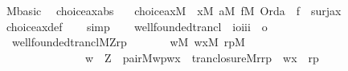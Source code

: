 \begin{isabellebody}
\isanewline
{}\isamarkupfalse%
\ M{\isacharunderscore}{\kern0pt}basic\ \isanewline
\isanewline
{}\isamarkupfalse%
\ choice{\isacharunderscore}{\kern0pt}ax{\isacharunderscore}{\kern0pt}abs\ {\isacharcolon}{\kern0pt}\isanewline
\ \ {\isachardoublequoteopen}choice{\isacharunderscore}{\kern0pt}ax{\isacharparenleft}{\kern0pt}M{\isacharparenright}{\kern0pt}\ {\isasymlongleftrightarrow}\ {\isacharparenleft}{\kern0pt}{\isasymforall}x{\isacharbrackleft}{\kern0pt}M{\isacharbrackright}{\kern0pt}{\isachardot}{\kern0pt}\ {\isasymexists}a{\isacharbrackleft}{\kern0pt}M{\isacharbrackright}{\kern0pt}{\isachardot}{\kern0pt}\ {\isasymexists}f{\isacharbrackleft}{\kern0pt}M{\isacharbrackright}{\kern0pt}{\isachardot}{\kern0pt}\ Ord{\isacharparenleft}{\kern0pt}a{\isacharparenright}{\kern0pt}\ {\isasymand}\ f\ {\isasymin}\ surj{\isacharparenleft}{\kern0pt}a{\isacharcomma}{\kern0pt}x{\isacharparenright}{\kern0pt}{\isacharparenright}{\kern0pt}{\isachardoublequoteclose}\isanewline
%
\isadelimproof
\ \ %
\endisadelimproof
%
\isatagproof
{}\isamarkupfalse%
\ choice{\isacharunderscore}{\kern0pt}ax{\isacharunderscore}{\kern0pt}def\isanewline
\ \ \isamarkupfalse%
\ {\isacharparenleft}{\kern0pt}simp{\isacharparenright}{\kern0pt}%
\endisatagproof
{\isafoldproof}%
%
\isadelimproof
\isanewline
%
\endisadelimproof
\isanewline
{}\isamarkupfalse%
\ \isanewline
\isanewline
{}\isamarkupfalse%
\isanewline
\ \ wellfounded{\isacharunderscore}{\kern0pt}trancl\ {\isacharcolon}{\kern0pt}{\isacharcolon}{\kern0pt}\ {\isachardoublequoteopen}{\isacharbrackleft}{\kern0pt}i{\isacharequal}{\kern0pt}{\isachargreater}{\kern0pt}o{\isacharcomma}{\kern0pt}i{\isacharcomma}{\kern0pt}i{\isacharcomma}{\kern0pt}i{\isacharbrackright}{\kern0pt}\ {\isacharequal}{\kern0pt}{\isachargreater}{\kern0pt}\ o{\isachardoublequoteclose}\ \isanewline
\ \ {\isachardoublequoteopen}wellfounded{\isacharunderscore}{\kern0pt}trancl{\isacharparenleft}{\kern0pt}M{\isacharcomma}{\kern0pt}Z{\isacharcomma}{\kern0pt}r{\isacharcomma}{\kern0pt}p{\isacharparenright}{\kern0pt}\ {\isasymequiv}\isanewline
\ \ \ \ \ \ {\isasymexists}w{\isacharbrackleft}{\kern0pt}M{\isacharbrackright}{\kern0pt}{\isachardot}{\kern0pt}\ {\isasymexists}wx{\isacharbrackleft}{\kern0pt}M{\isacharbrackright}{\kern0pt}{\isachardot}{\kern0pt}\ {\isasymexists}rp{\isacharbrackleft}{\kern0pt}M{\isacharbrackright}{\kern0pt}{\isachardot}{\kern0pt}\isanewline
\ \ \ \ \ \ \ \ \ \ \ \ \ \ \ w\ {\isasymin}\ Z\ {\isacharampersand}{\kern0pt}\ pair{\isacharparenleft}{\kern0pt}M{\isacharcomma}{\kern0pt}w{\isacharcomma}{\kern0pt}p{\isacharcomma}{\kern0pt}wx{\isacharparenright}{\kern0pt}\ {\isacharampersand}{\kern0pt}\ tran{\isacharunderscore}{\kern0pt}closure{\isacharparenleft}{\kern0pt}M{\isacharcomma}{\kern0pt}r{\isacharcomma}{\kern0pt}rp{\isacharparenright}{\kern0pt}\ {\isacharampersand}{\kern0pt}\ wx\ {\isasymin}\ rp{\isachardoublequoteclose}\isanewline

\end{isabellebody}
